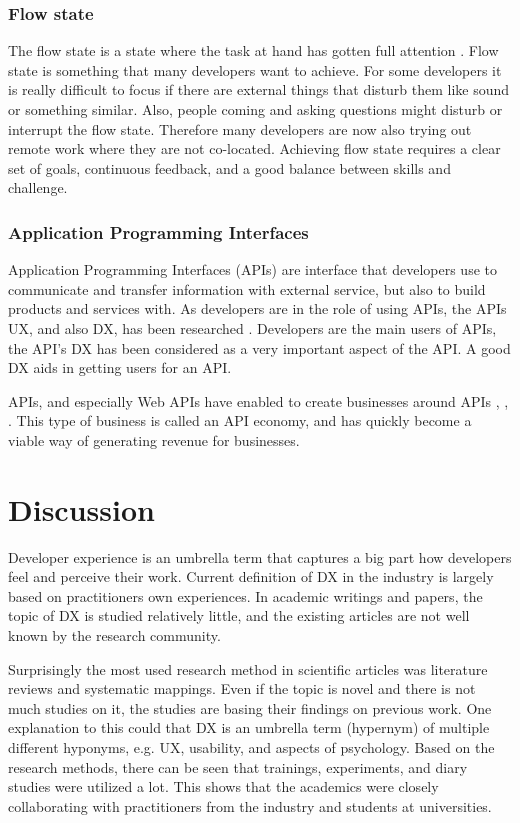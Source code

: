 \documentclass[english, 12pt, a4paper, sci, utf8, a-1b, online]{aaltothesis}
\begin{document}
\subsubsection{Flow state}

The flow state is a state where the task at hand has gotten full attention \parencite{flow-intrinsic-dx}. Flow state is something that many developers want to achieve. For some developers it is really difficult to focus if there are external things that disturb them like sound or something similar. Also, people coming and asking questions might disturb or interrupt the flow state. Therefore many developers are now also trying out remote work where they are not co-located. Achieving flow state requires a clear set of goals, continuous feedback, and a good balance between skills and challenge.

\subsubsection{Application Programming Interfaces}

Application Programming Interfaces (APIs) are interface that developers use to communicate and transfer information with external service, but also to build products and services with. As developers are in the role of using APIs, the APIs UX, and also DX, has been researched \parencite{api-designers}. Developers are the main users of APIs, the API's DX has been considered as a very important aspect of the API. A good DX aids in getting users for an API.

APIs, and especially Web APIs have enabled to create businesses around APIs \parencite{api-ecosystem}, \parencite{web-api-economy}, \parencite{moilanen2018api}. This type of business is called an API economy, and has quickly become a viable way of generating revenue for businesses.

\clearpage
\section{Discussion} \label{section:discussion}

Developer experience is an umbrella term that captures a big part how developers feel and perceive their work. Current definition of DX in the industry is largely based on practitioners own experiences. In academic writings and papers, the topic of DX is studied relatively little, and the existing articles are not well known by the research community.

Surprisingly the most used research method in scientific articles was literature reviews and systematic mappings. Even if the topic is novel and there is not much studies on it, the studies are basing their findings on previous work. One explanation to this could that DX is an umbrella term (hypernym) of multiple different hyponyms, e.g. UX, usability, and aspects of psychology. Based on the research methods, there can be seen that trainings, experiments, and diary studies were utilized a lot. This shows that the academics were closely collaborating with practitioners from the industry and students at universities.
\end{document}
